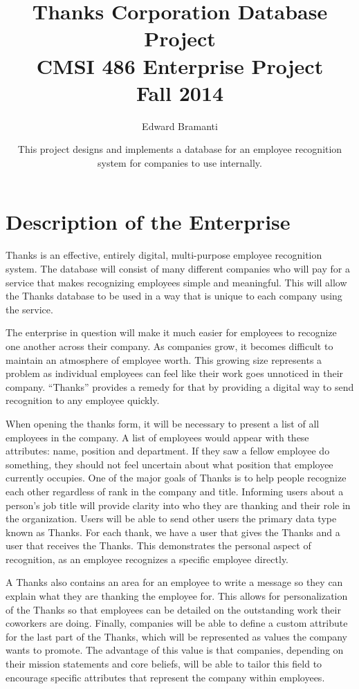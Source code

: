 \documentclass[11pt]{report}
\title{Thanks Corporation Database Project\\CMSI 486 Enterprise Project\\Fall 2014}
\author{Edward Bramanti}
\date{This project designs and implements a database for an employee recognition system for companies to use internally.}
\providecommand\phantomsection{}
\begin{document}
\clearpage
\phantomsection
{}
\maketitle
\clearpage
\phantomsection
{}
\tableofcontents
\setcounter{page}{2}
\setcounter{chapter}{2}
\chapter{Description of the Enterprise}

Thanks is an effective, entirely digital, multi-purpose employee recognition system. The database will consist of many different companies who will pay for a service that makes recognizing employees simple and meaningful. This will allow the Thanks database to be used in a way that is unique to each company using the service.

The enterprise in question will make it much easier for employees to recognize one another across their company. As companies grow, it becomes difficult to maintain an atmosphere of employee worth. This growing size represents a problem as individual employees can feel like their work goes unnoticed in their company. “Thanks” provides a remedy for that by providing a digital way to send recognition to any employee quickly.

When opening the thanks form, it will be necessary to present a list of all employees in the company. A list of employees would appear with these attributes: name, position and department. If they saw a fellow employee do something, they should not feel uncertain about what position that employee currently occupies. One of the major goals of Thanks is to help people recognize each other regardless of rank in the company and title. Informing users about a person's job title will provide clarity into who they are thanking and their role in the organization. Users will be able to send other users the primary data type known as Thanks. For each thank, we have a user that gives the Thanks and a user that receives the Thanks. This demonstrates the personal aspect of recognition, as an employee recognizes a specific employee directly.

A Thanks also contains an area for an employee to write a message so they can explain what they are thanking the employee for. This allows for personalization of the Thanks so that employees can be detailed on the outstanding work their coworkers are doing. Finally, companies will be able to define a custom attribute for the last part of the Thanks, which will be represented as values the company wants to promote. The advantage of this value is that companies, depending on their mission statements and core beliefs, will be able to tailor this field to encourage specific attributes that represent the company within employees.
\end{document}
